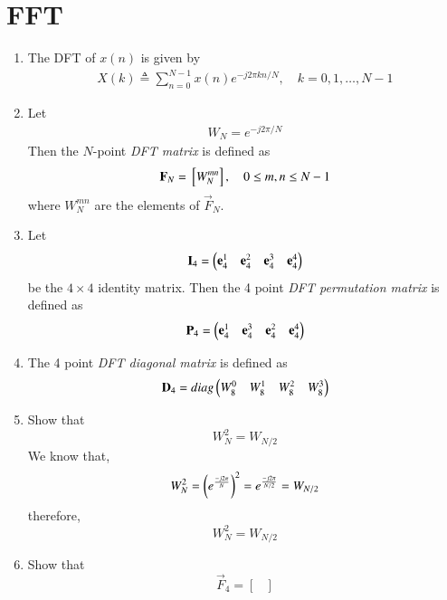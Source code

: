 \documentclass[journal,12pt,twocolumn]{IEEEtran}
\renewcommand\thesection{\arabic{section}}
\begin{document}
\section{FFT}
\begin{enumerate}[label=\thesection.\arabic*]

    \item The DFT of $x(n)$ is given by
    \begin{align}
        X(k) \triangleq \sum_{n=0}^{N-1} x(n) e^{-j 2 \pi k n / N}, \quad k=0,1, \ldots, N-1
    \end{align}
\item Let 
	\begin{align}
W_{N} = e^{-j2\pi/N} 
	\end{align}
		Then the $N$-point {\em DFT matrix} is defined as 
	\begin{align}
		\mathbf{F}_{N} = {}\left[W_{N}^{mn}\right], \quad 0 \le m,n \le N-1 
	\end{align}
	where $W_{N}^{mn}$ are the elements of $\vec{F}_{N}$.
\item Let 
	\begin{align}
		\mathbf{I}_4 = \begin{pmatrix}\mathbf{e}_4^{1} &\mathbf{e}_4^{2} &\mathbf{e}_4^{3} &\mathbf{e}_4^{4} \end{pmatrix}
	\end{align}
		be the $4\times 4$ identity matrix.  Then the 4 point {\em DFT permutation matrix} is defined as 
	\begin{align}
		\mathbf{P}_4 = \begin{pmatrix}\mathbf{e}_4^{1} &\mathbf{e}_4^{3} &\mathbf{e}_4^{2} &\mathbf{e}_4^{4} \end{pmatrix}
	\end{align}
\item The 4 point {\em DFT diagonal matrix} is defined as 
	\begin{align}
		\mathbf{D}_4 = diag\begin{pmatrix}W_{8}^{0} & W_{8}^{1} & W_{8}^{2} & W_{8}^{3}\end{pmatrix}
	\end{align}
\item Show that 
\begin{equation}
    W_{N}^{2}=W_{N/2}
\end{equation} 
\solution We know that,
\begin{align}
W_{N}^{2} = \left(e^{\frac{-j2\pi}{N}}\right)^{2}
= e^{\frac{-j2\pi}{N/2}}
= W_{N/2}
\end{align}
therefore,
\begin{equation}
    W_{N}^{2}=W_{N/2}
\end{equation} 
\item Show that 
\begin{equation}
	\vec{F}_{4}=
\begin{bmatrix}

\end{bmatrix}
\end{equation}
\end{enumerate}
\end{document}
